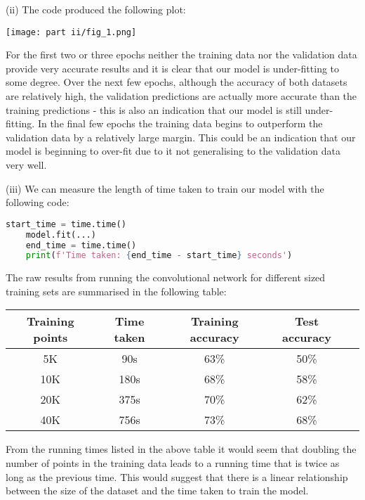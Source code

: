 \documentclass[12pt]{article}
\begin{document}
\indent (ii) The code produced the following plot:

\begin{center}
    \texttt{[image: part ii/fig\_1.png]}
\end{center}

For the first two or three epochs neither the training data nor the validation data provide very accurate results and it is clear that our model is under-fitting to some degree. Over the next few epochs, although the accuracy of both datasets are relatively high, the validation predictions are actually more accurate than the training predictions - this is also an indication that our model is still under-fitting. In the final few epochs the training data begins to outperform the validation data by a relatively large margin. This could be an indication that our model is beginning to over-fit due to it not generalising to the validation data very well.

\indent (iii) We can measure the length of time taken to train our model with the following code:

\begin{center}
    \lstset{basicstyle=\footnotesize}
    \begin{lstlisting}[language=Python]
    start_time = time.time()
    model.fit(...)
    end_time = time.time()
    print(f'Time taken: {end_time - start_time} seconds')
    \end{lstlisting}
\end{center}

The raw results from running the convolutional network for different sized training sets are summarised in the following table:

\begin{center}
    \begin{tabular}{|c|c|c|c|c|}
        \hline
        Training points & Time taken & Training accuracy & Test accuracy \\ \hline
        5K & 90s & 63\% & 50\% \\
        10K & 180s & 68\% & 58\% \\
        20K & 375s & 70\% & 62\% \\
        40K & 756s & 73\% & 68\% \\
        \hline
    \end{tabular}
\end{center}

From the running times listed in the above table it would seem that doubling the number of points in the training data leads to a running time that is twice as long as the previous time. This would suggest that there is a linear relationship between the size of the dataset and the time taken to train the model.
\end{document}
